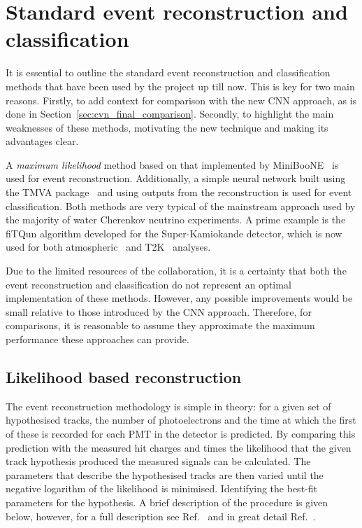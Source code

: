 \section{Standard event reconstruction and classification} %
\label{sec:cvn_old} %

It is essential to outline the standard event reconstruction and classification methods that have
been used by the \chips project up till now. This is key for two main reasons. Firstly, to add
context for comparison with the new CNN approach, as is done in
Section~\ref{sec:cvn_final_comparison}. Secondly, to highlight the main weaknesses of these
methods, motivating the new technique and making its advantages clear.

A \emph{maximum likelihood} method based on that implemented by MiniBooNE~\cite{patterson2009} is
used for event reconstruction. Additionally, a simple neural network built using the TMVA
package~\cite{hocker2007} and using outputs from the reconstruction is used for event
classification. Both methods are very typical of the mainstream approach used by the majority of
water Cherenkov neutrino experiments. A prime example is the fiTQun algorithm developed for the
Super-Kamiokande detector, which is now used for both atmospheric~\cite{jiang2019} and
T2K~\cite{missert2017} analyses.

Due to the limited resources of the \chips collaboration, it is a certainty that both the event
reconstruction and classification do not represent an optimal implementation of these methods.
However, any possible improvements would be small relative to those introduced by the CNN
approach. Therefore, for comparisons, it is reasonable to assume they approximate the maximum
performance these approaches can provide.

\subsection{Likelihood based reconstruction} %
\label{sec:cvn_old_reco} %

The event reconstruction methodology is simple in theory: for a given set of hypothesised tracks,
the number of photoelectrons and the time at which the first of these is recorded for each PMT in
the detector is predicted. By comparing this prediction with the measured hit charges and times
the likelihood that the given track hypothesis produced the measured signals can be calculated.
The parameters that describe the hypothesised tracks are then varied until the negative logarithm
of the likelihood is minimised. Identifying the best-fit parameters for the hypothesis. A brief
description of the procedure is given below, however, for a full description see
Ref.~\cite{blake2016} and in great detail Ref.~\cite{perch2017}.

